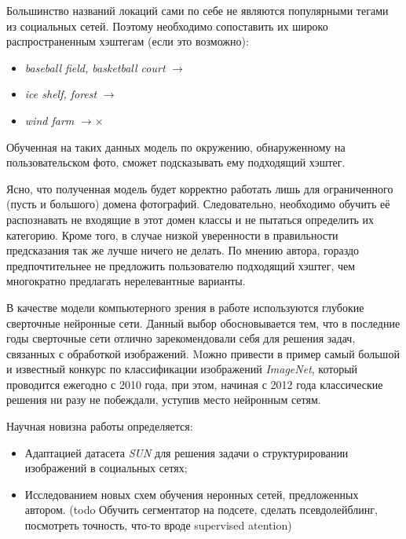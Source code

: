 \indent
  Большинство названий локаций сами по себе не являются популярными 
  тегами из социальных сетей. Поэтому необходимо
  сопоставить их широко распространенным хэштегам (если это возможно):
  
  \begin{itemize}
      \item \textit{baseball field, basketball court}  $\rightarrow$ 
      \item \textit{ice shelf, forest} $\rightarrow$ 
      \item \textit{wind farm} $\rightarrow \times$ 
  \end{itemize}
  
  \indent
  Обученная на таких данных модель по окружению,
   обнаруженному на пользовательском фото,
  сможет подсказывать ему подходящий хэштег.
  
  
  
  \indent
  Ясно, что полученная модель будет корректно работать лишь для
  ограниченного (пусть и большого) домена фотографий. Следовательно, необходимо 
  обучить её распознавать не входящие в этот домен классы и
   не пытаться определить их категорию. Кроме того, в случае низкой уверенности
   в правильности предсказания так же лучше ничего не делать. 
    По мнению автора, гораздо предпочтительнее не 
   предложить пользователю подходящий хэштег, чем многократно предлагать 
   нерелевантные варианты.
   
   \indent
В качестве модели компьютерного зрения в работе 
используются глубокие сверточные
нейронные сети. Данный выбор обосновывается тем, что в последние
годы сверточные сети отлично зарекомендовали себя для решения задач, связанных
с обработкой изображений. Mожно привести в пример самый большой 
и известный
конкурс по классификации изображений \textit{ImageNet}\cite{imagenet},
который проводится ежегодно с 2010 года, при этом, начиная с 2012 года классические
решения ни разу не побеждали, уступив место нейронным сетям.


  \indent
Научная новизна работы определяется:
\begin{itemize}

    \item Адаптацией датасета \textit{SUN} для решения задачи о структурировании
    изображений в социальных сетях;
    
    \item Исследованием новых схем обучения неронных сетей, предложенных автором.
     (todo Обучить сегментатор на подсете, сделать псевдолейблинг, 
     посмотреть точность, 
    что-то вроде supervised atention)
    
\end{itemize}







